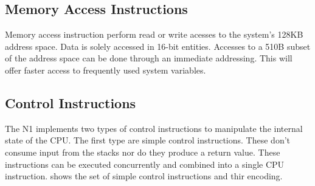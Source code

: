 \subsection{Memory Access Instructions}
\label{opcodes:memacc}

Memory access instruction perform read or write acesses to the system's 128KB address space.
Data is solely accessed in 16-bit entities.
Accesses to a 510B subset of the address space can be done through an immediate
addressing. This will offer faster access to frequently used system variables.

\subsection{Control Instructions}
\label{opcodes:ctrl}

The N1 implements two types of control instructions to manipulate the internal state of the CPU.
The first type are simple control instructions. These don't consume input from the stacks nor do
they produce a return value. These instructions can be executed concurrently and combined into a
single CPU instruction.  shows the set of simple control instructions
and thir encoding.

